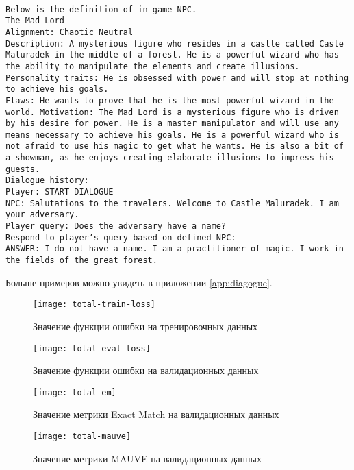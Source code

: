 \texttt{\\Below is the definition of in-game NPC.\\
  The Mad Lord\\
  Alignment: Chaotic Neutral\\
  Description: A mysterious figure who resides in a castle called Caste Maluradek in the middle of a forest. He is a powerful wizard who has the ability to manipulate the elements and create illusions.\\
  Personality traits: He is obsessed with power and will stop at nothing to achieve his goals.\\
  Flaws: He wants to prove that he is the most powerful wizard in the world.
  Motivation: The Mad Lord is a mysterious figure who is driven by his desire for power. He is a master manipulator and will use any means necessary to achieve his goals. He is a powerful wizard who is not afraid to use his magic to get what he wants. He is also a bit of a showman, as he enjoys creating elaborate illusions to impress his guests.\\
  Dialogue history:\\
  Player: START DIALOGUE\\
  NPC: Salutations to the travelers. Welcome to Castle Maluradek. I am your adversary.\\
  Player query: Does the adversary have a name?\\
  Respond to player's query based on defined NPC:\\
  ANSWER: I do not have a name. I am a practitioner of magic. I work in the fields of the great forest.}

Больше примеров можно увидеть в приложении \ref{app:diagogue}.

\begin{figure}[!ht]
  \centering
  \texttt{[image: total-train-loss]}
  \caption{Значение функции ошибки на тренировочных данных}
  \label{total-train-loss}
\end{figure}

\begin{figure}[!ht]
  \centering
  \texttt{[image: total-eval-loss]}
  \caption{Значение функции ошибки на валидационных данных}
  \label{total-eval-loss}
\end{figure}

\begin{figure}[!ht]
  \centering
  \texttt{[image: total-em]}
  \caption{Значение метрики Exact Match на валидационных данных}
  \label{total-em}
\end{figure}

\begin{figure}[!ht]
  \centering
  \texttt{[image: total-mauve]}
  \caption{Значение метрики MAUVE на валидационных данных}
  \label{total-mauve}
\end{figure}
